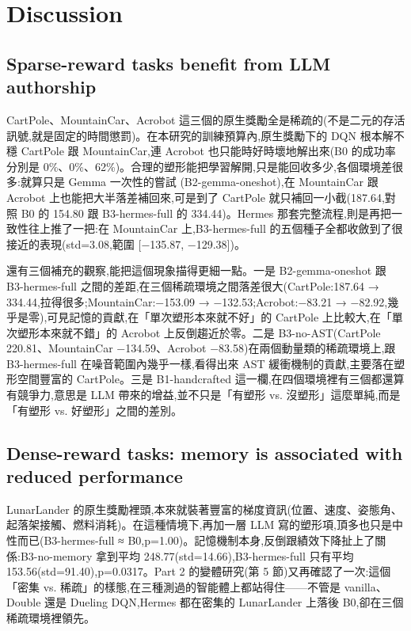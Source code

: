 \documentclass[conference,onecolumn,letterpaper,10pt]{IEEEtran}
\begin{document}
\section{Discussion}

\subsection{Sparse-reward tasks benefit from LLM authorship}

CartPole、MountainCar、Acrobot 這三個的原生獎勵全是稀疏的(不是二元的存活訊號,就是固定的時間懲罰)。在本研究的訓練預算內,原生獎勵下的 DQN 根本解不穩 CartPole 跟 MountainCar,連 Acrobot 也只能時好時壞地解出來(B0 的成功率分別是 0\%、0\%、62\%)。合理的塑形能把學習解開,只是能回收多少,各個環境差很多:就算只是 Gemma 一次性的嘗試 (B2-gemma-oneshot),在 MountainCar 跟 Acrobot 上也能把大半落差補回來,可是到了 CartPole 就只補回一小截(187.64,對照 B0 的 154.80 跟 B3-hermes-full 的 334.44)。Hermes 那套完整流程,則是再把一致性往上推了一把:在 MountainCar 上,B3-hermes-full 的五個種子全都收斂到了很接近的表現(std=3.08,範圍 {[}−135.87, −129.38{]})。

還有三個補充的觀察,能把這個現象描得更細一點。一是 B2-gemma-oneshot 跟 B3-hermes-full 之間的差距,在三個稀疏環境之間落差很大(CartPole:187.64 → 334.44,拉得很多;MountainCar:−153.09 → −132.53;Acrobot:−83.21 → −82.92,幾乎是零),可見記憶的貢獻,在「單次塑形本來就不好」的 CartPole 上比較大,在「單次塑形本來就不錯」的 Acrobot 上反倒趨近於零。二是 B3-no-AST(CartPole 220.81、MountainCar −134.59、Acrobot −83.58)在兩個動量類的稀疏環境上,跟 B3-hermes-full 在噪音範圍內幾乎一樣,看得出來 AST 緩衝機制的貢獻,主要落在塑形空間豐富的 CartPole。三是 B1-handcrafted 這一欄,在四個環境裡有三個都還算有競爭力,意思是 LLM 帶來的增益,並不只是「有塑形 vs. 沒塑形」這麼單純,而是「有塑形 vs. 好塑形」之間的差別。

\subsection{Dense-reward tasks: memory is associated with reduced performance}

LunarLander 的原生獎勵裡頭,本來就裝著豐富的梯度資訊(位置、速度、姿態角、起落架接觸、燃料消耗)。在這種情境下,再加一層 LLM 寫的塑形項,頂多也只是中性而已(B3-hermes-full ≈ B0,p=1.00)。記憶機制本身,反倒跟績效下降扯上了關係:B3-no-memory 拿到平均 248.77(std=14.66),B3-hermes-full 只有平均 153.56(std=91.40),p=0.0317。Part 2 的變體研究(第 5 節)又再確認了一次:這個「密集 vs. 稀疏」的樣態,在三種測過的智能體上都站得住------不管是 vanilla、Double 還是 Dueling DQN,Hermes 都在密集的 LunarLander 上落後 B0,卻在三個稀疏環境裡領先。
\end{document}
